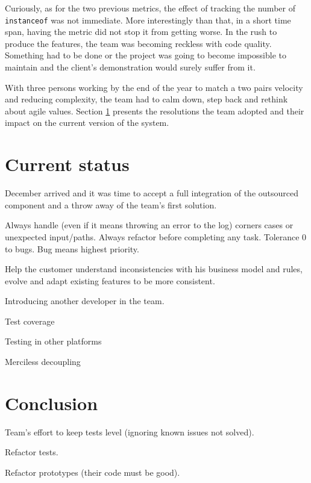 \documentclass[lnbip]{svmultln}
\begin{document}
Curiously, as for the two previous metrics, the effect of tracking the
number of \texttt{instanceof} was not immediate. More interestingly
than that, in a short time span, having the metric did not stop it
from getting worse. In the rush to produce the features, the team was
becoming reckless with code quality.  Something had to be done or the
project was going to become impossible to maintain and the client's
demonstration would surely suffer from it.

With three persons working by the end of the year to match a two pairs
velocity and reducing complexity, the team had to calm down, step back
and rethink about agile values. Section \ref{sec:nowadays} presents
the resolutions the team adopted and their impact on the current
version of the system.

\section{Current status}
\label{sec:nowadays}

December arrived and it was time to accept a full integration of the
outsourced component and a throw away of the team's first solution.

Always handle (even if it means throwing an error to the log) corners
cases or unexpected input/paths. Always refactor before completing any
task. Tolerance 0 to bugs. Bug means highest priority.

Help the customer understand inconsistencies with his business model
and rules, evolve and adapt existing features to be more consistent.

Introducing another developer in the team.

Test coverage

Testing in other platforms

Merciless decoupling

\section{Conclusion}
\label{sec:conclusion}

Team's effort to keep tests level (ignoring known issues not solved).

Refactor tests.

Refactor prototypes (their code must be good).
\end{document}
